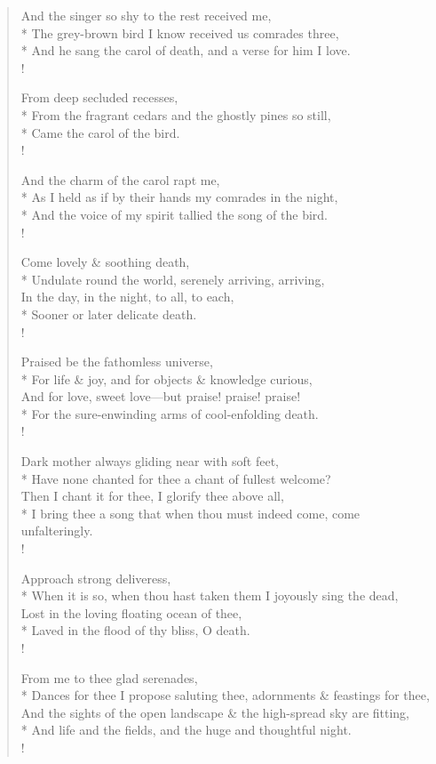 \documentclass[MAIN]{subfiles}
\begin{document}
\begin{verse}
And the singer so shy to the rest received me,\\*
The grey-brown bird I know received us comrades three,\\*
And he sang the carol of death, and a verse for him I love.\\!

From deep secluded recesses,\\*
From the fragrant cedars and the ghostly pines so still,\\*
Came the carol of the bird.\\!

And the charm of the carol rapt me,\\*
As I held as if by their hands my comrades in the night,\\*
And the voice of my spirit tallied the song of the bird.\\!

Come lovely \& soothing death,\\* 
Undulate round the world, serenely arriving, arriving,\\
In the day, in the night, to all, to each,\\*
Sooner or later delicate death.\\!

Praised be the fathomless universe,\\*
For life \& joy, and for objects \& knowledge curious,\\
And for love, sweet love—but praise! praise! praise!\\*
For the sure-enwinding arms of cool-enfolding death.\\!

Dark mother always gliding near with soft feet,\\*
Have none chanted for thee a chant of fullest welcome?\\
Then I chant it for thee, I glorify thee above all,\\*
I bring thee a song that when thou must indeed come, come unfalteringly.\\!

Approach strong deliveress,\\*
When it is so, when thou hast taken them I joyously sing the dead,\\
Lost in the loving floating ocean of thee,\\*
Laved in the flood of thy bliss, O death.\\!

From me to thee glad serenades,\\*
Dances for thee I propose saluting thee, adornments \& feastings for thee,\\
And the sights of the open landscape \& the high-spread sky are fitting,\\*
And life and the fields, and the huge and thoughtful night.\\!


\end{verse}
\end{document}
